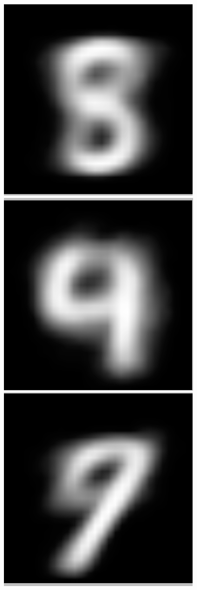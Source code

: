 \documentclass[submit]{harvardml}
\begin{document}
\begin{figure}[h]
		\includegraphics[scale=0.1]{./m5/6}
		\includegraphics[scale=0.1]{./m5/7}
		\includegraphics[scale=0.1]{./m5/8}

\end{figure}
\end{document}
